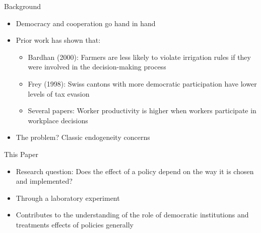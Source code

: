 \documentclass[11pt,notes=hide,aspectratio=169,mathserif]{beamer}
\begin{document}
\begin{frame}{Background}
\begin{itemize}
    \item Democracy and cooperation go hand in hand
    \item Prior work has shown that:
    \begin{itemize}
        \item Bardhan (2000): Farmers are less likely to violate irrigation rules if they were involved in the decision-making process
        \item Frey (1998): Swiss cantons with more democratic participation have lower levels of tax evasion
        \item Several papers: Worker productivity is higher when workers participate in workplace decisions
        \end{itemize}
    \item The problem? \pause  Classic endogeneity concerns
    \end{itemize}
\end{frame}

\begin{frame}{This Paper}
\begin{itemize}
    \item Research question: Does the effect of a policy depend on the way it is chosen and implemented?
    \pause \item Through a laboratory experiment 
    \pause \item Contributes to the understanding of the role of democratic institutions and treatments effects of policies generally
\end{itemize}
\end{frame}
\end{document}
